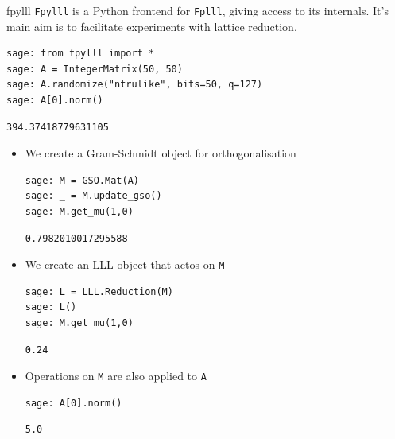 \documentclass[presentation,smaller]{beamer}
\begin{document}
\begin{frame}{fpylll}
 \texttt{Fpylll} is a Python frontend for \texttt{Fplll}, giving access to its internals. It’s main aim is to facilitate experiments with lattice reduction.

\lstset{language=sage,label= ,caption= ,captionpos=b,numbers=none}
\begin{lstlisting}
sage: from fpylll import *
sage: A = IntegerMatrix(50, 50)
sage: A.randomize("ntrulike", bits=50, q=127)
sage: A[0].norm()
\end{lstlisting}

\begin{verbatim}
394.37418779631105
\end{verbatim}

\framebreak

\begin{itemize}
\item We create a Gram-Schmidt object for orthogonalisation

\lstset{language=sage,label= ,caption= ,captionpos=b,numbers=none}
\begin{lstlisting}
sage: M = GSO.Mat(A)
sage: _ = M.update_gso()
sage: M.get_mu(1,0)
\end{lstlisting}

\begin{verbatim}
0.7982010017295588
\end{verbatim}

\item We create an LLL object that actos on \texttt{M}

\lstset{language=sage,label= ,caption= ,captionpos=b,numbers=none}
\begin{lstlisting}
sage: L = LLL.Reduction(M)
sage: L()
sage: M.get_mu(1,0)
\end{lstlisting}

\begin{verbatim}
0.24
\end{verbatim}

\item Operations on \texttt{M} are also applied to \texttt{A}

\lstset{language=sage,label= ,caption= ,captionpos=b,numbers=none}
\begin{lstlisting}
sage: A[0].norm()
\end{lstlisting}

\begin{verbatim}
5.0
\end{verbatim}
\end{itemize}
\end{frame}
\end{document}
